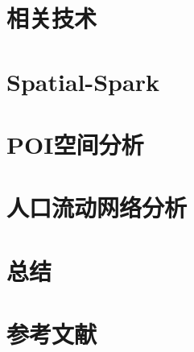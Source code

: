 \documentclass{beamer}
\begin{document}
\section{相关技术}
\section{Spatial-Spark}
\section{POI空间分析}
\section{人口流动网络分析}
\section{总结}
\section*{参考文献}
\end{document}
